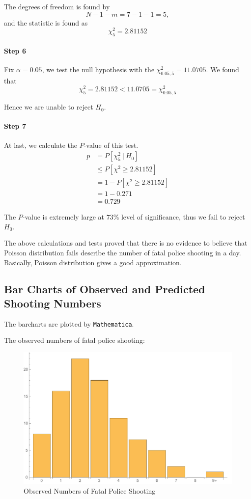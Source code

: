 \documentclass[a4paper]{article}
\begin{document}
The degrees of freedom is found by 
$$N-1-m=7-1-1=5,$$
and the statistic is found as
$$\chi_{5}^2 = 2.81152$$

\paragraph{Step 6} Fix $\alpha=0.05$, we test the null hypothesis with the $\chi^2_{0.05,5}=11.0705$. We found that
$$\chi_{5}^2 = 2.81152<11.0705=\chi^2_{0.05,5}$$

Hence we are unable to reject $H_0$.

\paragraph{Step 7} At last, we calculate the $P$-value of this test.
\begin{align*}
p &= P[\chi_5^2\ |\ H_0]\\
&\leq P[\chi^2\geq 2.81152] \\
&= 1-P[\chi^2\geq 2.81152]\\
&= 1-0.271\\
&=0.729
\end{align*}

The $P$-value is extremely large at $73\%$ level of significance, thus we fail to reject $H_0$.

The above calculations and tests proved that there is no evidence to believe that Poisson distribution fails describe the number of fatal police shooting in a day. Basically, Poisson distribution gives a good approximation.
\subsection{Bar Charts of Observed and Predicted Shooting Numbers}
The barcharts are plotted by \texttt{Mathematica}.

The observed numbers of fatal police shooting:
\begin{figure}[!htbp]
\centering
\includegraphics[width=0.8\linewidth]{observedbar2.pdf}
\caption{Observed Numbers of Fatal Police Shooting}
\end{figure}
\end{document}
